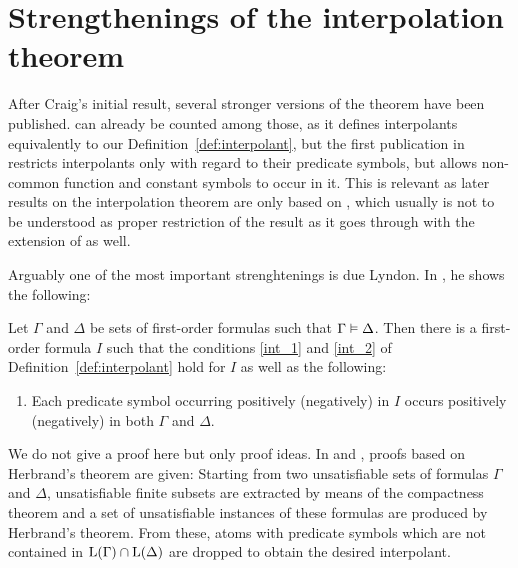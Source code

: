 \section{Strengthenings of the interpolation theorem}

After Craig's initial result, several stronger versions of the theorem have been published.
\cite{Craig57three} can already be counted among those,
as it defines interpolants equivalently to our Definition~\ref{def:interpolant}, 
but the first publication in \cite{Craig57linear} restricts interpolants only with regard to their predicate symbols, but allows non-common function and constant symbols to occur in it.
This is relevant as later results on the interpolation theorem are only based on \cite{Craig57linear}, which usually is not to be understood as proper restriction of the result as it goes through with the extension of \cite{Craig57three} as well.


Arguably one of the most important strenghtenings is due Lyndon. In \cite{lyndon59}, he shows the following:

\begin{thm}[Lyndon]
	\label{thm:lyndon}
Let $\Gamma$ and $\Delta$ be sets of first-order formulas such that $\Gamma \entails\nolinebreak \Delta$. 
Then there is a first-order formula $I$ such that the conditions \ref{int_1} and \ref{int_2} of Definition~\ref{def:interpolant} hold for $I$ as well as the following:
\begin{enumerate}
		\renewcommand{\theenumi}{\arabic{enumi}'}
		\setcounter{enumi}{2}
	\item Each predicate symbol occurring positively (negatively) in $I$ occurs positively (negatively) in both $\Gamma$ and $\Delta$.
		\label{int_lyndon_3}
\end{enumerate}
\end{thm}

We do not give a proof here but only proof ideas.
In \cite{lyndon59} and \cite{slagle70}, proofs based on Herbrand's theorem are given:
Starting from two unsatisfiable sets of formulas $\Gamma$ and $\Delta$, unsatisfiable finite subsets are extracted by means of the compactness theorem and a set of unsatisfiable instances of these formulas are produced by Herbrand's theorem.
From these, atoms with predicate symbols which are not contained in $\operatorname{L}(\Gamma) \cap \operatorname{L}(\Delta)$ are dropped to obtain the desired interpolant.

